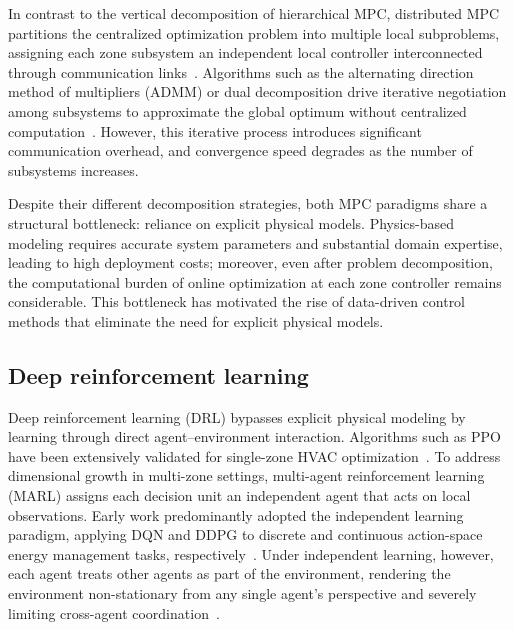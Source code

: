 \documentclass[a4paper]{cas-sc}
\begin{document}
In contrast to the vertical decomposition of hierarchical MPC, distributed MPC partitions the centralized optimization problem into multiple local subproblems, assigning each zone subsystem an independent local controller interconnected through communication links~\cite{Morosan2010-nd}. Algorithms such as the alternating direction method of multipliers (ADMM) or dual decomposition drive iterative negotiation among subsystems to approximate the global optimum without centralized computation~\cite{Su2020-qn,Li2021-ji}. However, this iterative process introduces significant communication overhead, and convergence speed degrades as the number of subsystems increases.

Despite their different decomposition strategies, both MPC paradigms share a structural bottleneck: reliance on explicit physical models. Physics-based modeling requires accurate system parameters and substantial domain expertise, leading to high deployment costs; moreover, even after problem decomposition, the computational burden of online optimization at each zone controller remains considerable. This bottleneck has motivated the rise of data-driven control methods that eliminate the need for explicit physical models.

\subsection{Deep reinforcement learning}

Deep reinforcement learning (DRL) bypasses explicit physical modeling by learning through direct agent--environment interaction. Algorithms such as PPO have been extensively validated for single-zone HVAC optimization~\cite{Liu2024-fk,Jiang2021-rg,Fu2023-zh}. To address dimensional growth in multi-zone settings, multi-agent reinforcement learning (MARL) assigns each decision unit an independent agent that acts on local observations. Early work predominantly adopted the independent learning paradigm, applying DQN and DDPG to discrete and continuous action-space energy management tasks, respectively~\cite{Prasad2019-vo,Lu2019-uf,Du2021-gj}. Under independent learning, however, each agent treats other agents as part of the environment, rendering the environment non-stationary from any single agent's perspective and severely limiting cross-agent coordination~\cite{Nguyen2020-ai,Canese2021-cw}.
\end{document}
